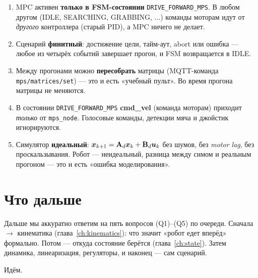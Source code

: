 \begin{notebox}
\begin{enumerate}
  \item MPC активен \textbf{только в FSM-состоянии} \texttt{DRIVE\_FORWARD\_MPS}.
        В любом другом (IDLE, SEARCHING, GRABBING, ...) команды моторам
        идут от \emph{другого} контроллера (старый PID), а MPC ничего не
        делает.
  \item Сценарий \textbf{финитный}: достижение цели, тайм-аут, abort или
        ошибка --- любое из четырёх событий завершает прогон, и FSM
        возвращается в IDLE.
  \item Между прогонами можно \textbf{пересобрать} матрицы (MQTT-команда
        \texttt{mps/matrices/set}) --- это и есть «учебный пульт».
        Во время прогона матрицы не меняются.
  \item В состоянии \texttt{DRIVE\_FORWARD\_MPS} \textbf{cmd\_vel} (команда
        моторам) приходит \emph{только} от \texttt{mps\_node}. Голосовые
        команды, детекции мяча и джойстик игнорируются.
  \item Симулятор \textbf{идеальный}: $\bm{x}_{k+1} = \mathbf{A}_d\bm{x}_k +
        \mathbf{B}_d\bm{u}_k$ без шумов, без \emph{motor lag}, без проскальзывания.
        Робот --- неидеальный, разница между симом и реальным прогоном
        --- это и есть «ошибка моделирования».
\end{enumerate}
\end{notebox}

\section{Что дальше}

Дальше мы аккуратно ответим на пять вопросов (Q1)--(Q5) по очереди. Сначала
$\to$ кинематика (глава~\ref{ch:kinematics}): что значит «робот едет вперёд»
формально. Потом --- откуда состояние берётся (глава~\ref{ch:state}). Затем
динамика, линеаризация, регуляторы, и наконец --- сам сценарий.

Идём.
